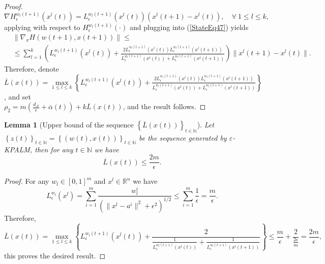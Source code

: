 \documentclass[11pt]{article}
\numberwithin{equation}{section}
\newtheorem{lemma}{Lemma}[proposition]
\begin{document}
\begin{proof}
\begin{equation*}
\nabla H_{\epsilon}^{w_l(t+1)}(x^l(t)) = L_{\epsilon}^{w_l(t+1)}(x^l(t)) \left( x^l(t+1) - x^l(t) \right) , \quad \forall \: 1 \leq l \leq k,
\end{equation*}
applying  with respect to $H_{\epsilon}^{w_l(t+1)}(\cdot)$ and plugging into (\ref{StateEq47}) yields
\begin{equation*}
\begin{aligned}
	&\| \nabla_x H(w(t+1),x(t+1)) \| \leq \\
	&\leq \sum\limits_{l=1}^{k} \left( L_{\epsilon}^{w_l(t+1)}(x^l(t)) + \frac{2 L_{\epsilon}^{w_l(t+1)}(x^l(t)) L_{\epsilon}^{w_l(t+1)}(x^l(t+1))}{L_{\epsilon}^{w_l(t+1)}(x^l(t)) + L_{\epsilon}^{w_l(t+1)}(x^l(t+1))} \right) \|x^l(t+1) - x^l(t)\| .
\end{aligned}
\end{equation*}
Therefore, denote $\overline{L}(x(t)) = \max\limits_{1 \leq l \leq k} \left\lbrace L_{\epsilon}^{w_l(t+1)}(x^l(t)) + \frac{2 L_{\epsilon}^{w_l(t+1)}(x^l(t)) L_{\epsilon}^{w_l(t+1)}(x^l(t+1))}{L_{\epsilon}^{w_l(t+1)}(x^l(t)) + L_{\epsilon}^{w_l(t+1)}(x^l(t+1))} \right\rbrace$, and set \\ $\rho_2 = m \left( \frac{d_{\mathcal{A}}}{\epsilon} + \overline{\alpha}(t) \right) + k\overline{L}(x(t))$, and the result follows.
\end{proof}

\begin{lemma}[Upper bound of the sequence $\left\lbrace \overline{L}(x(t)) \right\rbrace_{t \in \mathbb{N}}$]
Let $\left\lbrace z(t) \right\rbrace_{t \in \mathbb{N}} = \left\lbrace (w(t) , x(t)) \right\rbrace_{t \in \mathbb{N}}$ be the sequence generated by $\varepsilon$-KPALM, then for any $t \in \mathbb{N}$ we have
\begin{equation*}
	\overline{L}(x(t)) \leq \frac{2m}{\epsilon} .
\end{equation*}
\end{lemma}

\begin{proof}
For any $w_l \in \left[ 0,1 \right]^m$ and $x^l \in \mathbb{R}^n$ we have
\begin{equation*}
	L_{\epsilon}^{w_l}(x^l) = \sum\limits_{i=1}^m \frac{w^i_l}{\left( \|x^l - a^i\|^2 + {\epsilon}^2 \right)^{1/2}} \leq \sum\limits_{i=1}^m \frac{1}{\epsilon} = \frac{m}{\epsilon}.
\end{equation*}
Therefore,
\begin{equation*}
	\overline{L}(x(t)) = \max\limits_{1 \leq l \leq k} \left\lbrace L_{\epsilon}^{w_l(t+1)}(x^l(t)) + \frac{2}{\frac{1}{L_{\epsilon}^{w_l(t+1)}(x^l(t))} + \frac{1}{L_{\epsilon}^{w_l(t+1)}(x^l(t+1))}} \right\rbrace \leq \frac{m}{\epsilon} + \frac{2}{\frac{2\epsilon}{m}} = \frac{2m}{\epsilon} ,
\end{equation*}
this proves the desired result.
\end{proof}
\end{document}
